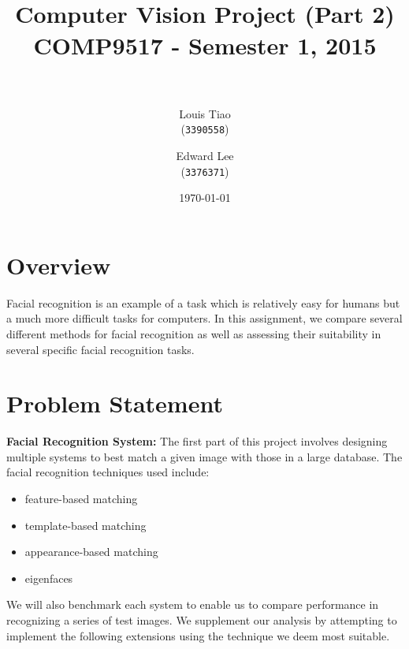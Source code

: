 \documentclass[11pt]{article} %
\title{ 
\normalfont \normalsize 
\horrule{0.5pt} \\[0.4cm] %
\Large Computer Vision Project (Part 2) \\ [0.1cm] %
\large COMP9517 - Semester 1, 2015 \\ [0.2cm]
\horrule{2pt} \\[0.5cm] %
}
\author{
  Louis Tiao \\
  (\texttt{3390558})
  \and
  Edward Lee\\
  (\texttt{3376371})
} %
\date{\normalsize\today} %
\theoremstyle{plain}
\theoremstyle{definition}
\theoremstyle{remark}
\numberwithin{equation}{section} %
\numberwithin{figure}{section} %
\numberwithin{table}{section} %
\begin{document}
\maketitle %

\section{Overview}

Facial recognition is an example of a task which is relatively easy for humans but a much more difficult tasks for computers. In this assignment, we compare several different methods for facial recognition as well as assessing their suitability in several specific facial recognition tasks.

\section{Problem Statement}


\textbf{Facial Recognition System:} The first part of this project involves designing multiple systems to best match a given image with those in a large database. The facial recognition techniques used include:
  \begin{itemize}
    \item feature-based matching \citep{krivzaj2010adaptation}
    \item template-based matching
    \item appearance-based matching
    \item eigenfaces \citep{turk1991eigenfaces}
  \end{itemize}
We will also benchmark each system to enable us to compare performance in recognizing a series of test images. We supplement our analysis by attempting to implement the following extensions using the technique we deem most suitable.
\end{document}
